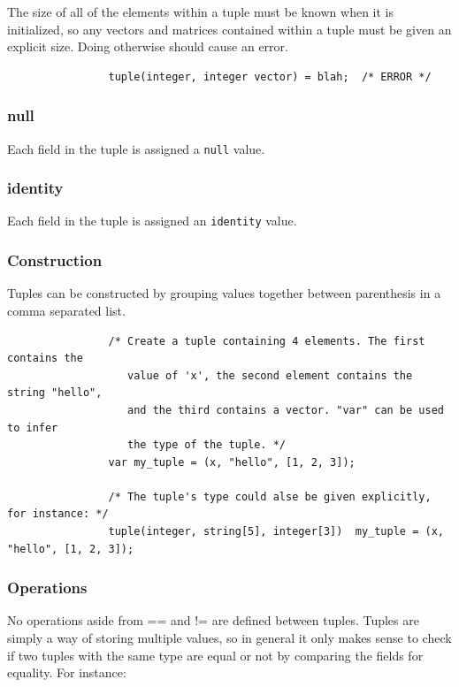 \documentclass{article}
\begin{document}
			The size of all of the elements within a tuple must be known when it is initialized, so any vectors and
			matrices contained within a tuple must be given an explicit size. Doing otherwise should cause an error.

			\begin{lstlisting}
				tuple(integer, integer vector) = blah;  /* ERROR */
			\end{lstlisting}

		\subsubsection{null}

			Each field in the tuple is assigned a \texttt{null} value.

		\subsubsection{identity}

			Each field in the tuple is assigned an \texttt{identity} value.

		\subsubsection{Construction}

			Tuples can be constructed by grouping values together between parenthesis in a comma separated list.
			\begin{lstlisting}
				/* Create a tuple containing 4 elements. The first contains the
				   value of 'x', the second element contains the string "hello",
				   and the third contains a vector. "var" can be used to infer
				   the type of the tuple. */
				var my_tuple = (x, "hello", [1, 2, 3]);

				/* The tuple's type could alse be given explicitly, for instance: */
				tuple(integer, string[5], integer[3])  my_tuple = (x, "hello", [1, 2, 3]);
			\end{lstlisting}

		\subsubsection{Operations}

			No operations aside from == and != are defined between tuples. Tuples are simply a way of storing multiple
			values, so in general it only makes sense to check if two tuples with the same type are equal or not by
			comparing the fields for equality. For instance:
\end{document}
